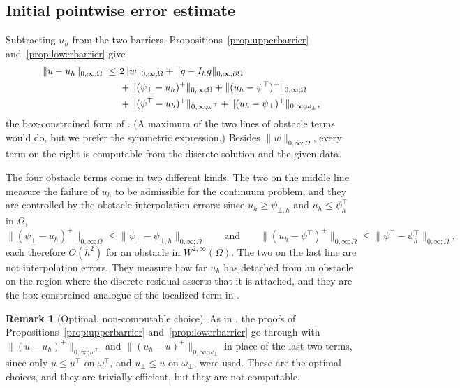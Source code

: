 \documentclass[12pt]{amsart}
\theoremstyle{definition}
\newtheorem{remark}{Remark}
\newcommand{\Om}{\Omega}
\newcommand{\dOm}{\partial\Omega}
\newcommand{\psilo}{\psi_\bot}
\newcommand{\psiup}{\psi^\top}
\newcommand{\psiloh}{\psi_{\bot,h}}
\newcommand{\psiuph}{\psi^\top_h}
\newcommand{\Ih}{I_h}
\newcommand{\ombot}{\omega_\bot}
\newcommand{\omtop}{\omega^\top}
\begin{document}
\subsection{Initial pointwise error estimate}

Subtracting $u_h$ from the two barriers, Propositions~\ref{prop:upperbarrier} and~\ref{prop:lowerbarrier} give
\begin{align}
\label{eq:barrierbound}
  \|u-u_h\|_{0,\infty;\Om} \ \le\ & 2\|w\|_{0,\infty;\Om} + \|g-\Ih g\|_{0,\infty;\dOm} \\
  &+ \|(\psilo-u_h)^+\|_{0,\infty;\Om} + \|(u_h-\psiup)^+\|_{0,\infty;\Om} \notag \\
  &+ \|(\psiup-u_h)^+\|_{0,\infty;\omtop} + \|(u_h-\psilo)^+\|_{0,\infty;\ombot}, \notag
\end{align}
the box-constrained form of \cite[formula (4.8)]{NSV03}.  (A maximum of the two lines of obstacle terms would do, but we prefer the symmetric expression.)  Besides $\|w\|_{0,\infty;\Om}$, every term on the right is computable from the discrete solution and the given data.

The four obstacle terms come in two different kinds.  The two on the middle line measure the failure of $u_h$ to be admissible for the continuum problem, and they are controlled by the obstacle interpolation errors: since $u_h \ge \psiloh$ and $u_h \le \psiuph$ in $\Om$,
\begin{equation}
\label{eq:violationbound}
  \|(\psilo-u_h)^+\|_{0,\infty;\Om} \le \|\psilo-\psiloh\|_{0,\infty;\Om}
  \qquad\text{and}\qquad
  \|(u_h-\psiup)^+\|_{0,\infty;\Om} \le \|\psiup-\psiuph\|_{0,\infty;\Om},
\end{equation}
each therefore $O(h^2)$ for an obstacle in $W^{2,\infty}(\Om)$.  The two on the last line are not interpolation errors.  They measure how far $u_h$ has detached from an obstacle on the region where the discrete residual asserts that it is attached, and they are the box-constrained analogue of the localized term in \cite[formula (4.6)]{NSV03}.

\begin{remark}[Optimal, non-computable choice]
\label{rem:optimalchoice}
As in \cite[Remark 4.3]{NSV03}, the proofs of Propositions~\ref{prop:upperbarrier} and~\ref{prop:lowerbarrier} go through with $\|(u-u_h)^+\|_{0,\infty;\omtop}$ and $\|(u_h-u)^+\|_{0,\infty;\ombot}$ in place of the last two terms, since only $u \le u^\top$ on $\omtop$, and $u_\bot \le u$ on $\ombot$, were used.  These are the optimal choices, and they are trivially efficient, but they are not computable.
\end{remark}
\end{document}
